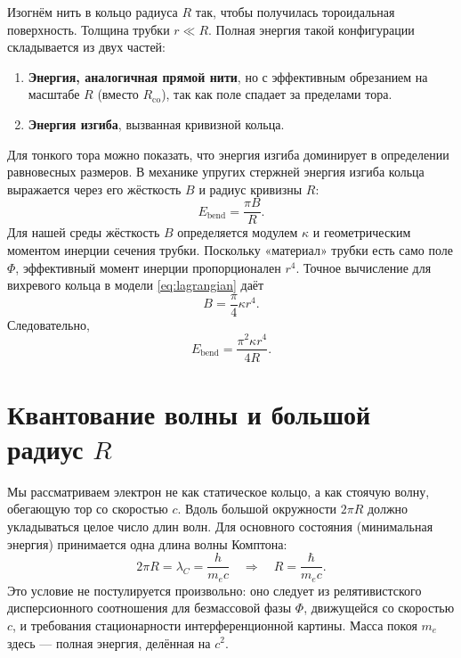 \documentclass[12pt,a4paper]{article}
\begin{document}
Изогнём нить в кольцо радиуса $R$ так, чтобы получилась тороидальная поверхность. Толщина трубки $r \ll R$. Полная энергия такой конфигурации складывается из двух частей:
\begin{enumerate}
    \item \textbf{Энергия, аналогичная прямой нити}, но с эффективным обрезанием на масштабе $R$ (вместо $R_{\text{co}}$), так как поле спадает за пределами тора.
    \item \textbf{Энергия изгиба}, вызванная кривизной кольца.
\end{enumerate}

Для тонкого тора можно показать, что энергия изгиба доминирует в определении равновесных размеров. В механике упругих стержней энергия изгиба кольца выражается через его жёсткость $B$ и радиус кривизны $R$:
\begin{equation}
E_{\text{bend}} = \frac{\pi B}{R}.
\label{eq:bend_general}
\end{equation}
Для нашей среды жёсткость $B$ определяется модулем $\kappa$ и геометрическим моментом инерции сечения трубки. Поскольку «материал» трубки есть само поле $\Phi$, эффективный момент инерции пропорционален $r^4$. Точное вычисление для вихревого кольца в модели \eqref{eq:lagrangian} даёт
\begin{equation}
B = \frac{\pi}{4} \kappa r^4.
\label{eq:stiffness}
\end{equation}
Следовательно,
\begin{equation}
E_{\text{bend}} = \frac{\pi^2 \kappa r^4}{4R}.
\label{eq:bend_energy}
\end{equation}

\section{Квантование волны и большой радиус $R$}

Мы рассматриваем электрон не как статическое кольцо, а как стоячую волну, обегающую тор со скоростью $c$. Вдоль большой окружности $2\pi R$ должно укладываться целое число длин волн. Для основного состояния (минимальная энергия) принимается одна длина волны Комптона:
\begin{equation}
2\pi R = \lambda_C = \frac{h}{m_e c} \quad\Longrightarrow\quad
R = \frac{\hbar}{m_e c}.
\label{eq:quantization}
\end{equation}
Это условие не постулируется произвольно: оно следует из релятивистского дисперсионного соотношения для безмассовой фазы $\Phi$, движущейся со скоростью $c$, и требования стационарности интерференционной картины. Масса покоя $m_e$ здесь — полная энергия, делённая на $c^2$.
\end{document}
